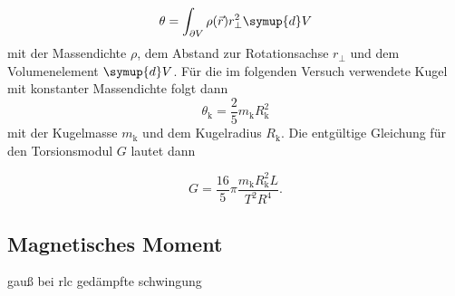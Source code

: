 \begin{equation}
  \theta = \int_{\partial V}^{} \rho(\vec{r}) r_\perp^2 \symup{d}V
\end{equation}
mit der Massendichte $\rho$, dem Abstand zur Rotationsachse $r_\perp$ und dem
Volumenelement $\symup{d}V$.
Für die im folgenden Versuch verwendete Kugel mit konstanter Massendichte
folgt dann
\begin{equation}
  \theta_\text{k} = \frac{2}{5} m_\text{k} R_\text{k}^2
\end{equation}
mit der Kugelmasse $m_\text{k}$ und dem Kugelradius $R_\text{k}$.
Die entgültige Gleichung für den Torsionsmodul $G$ lautet dann

\begin{equation}
  G = \frac{16}{5} \pi \frac{m_\text{k}R_\text{k}^2 L}{T^2 R^4}.
\end{equation}


\subsection{Magnetisches Moment}

gauß bei rlc gedämpfte schwingung

\cite{sample}
